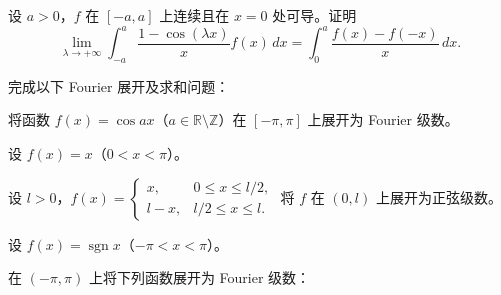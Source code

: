 \noindent\begin{minipage}{\textwidth}
设 $a>0$，$f$ 在 $[-a,a]$ 上连续且在 $x=0$ 处可导。证明\[\lim_{\lambda\to+\infty}\int_{-a}^a\frac{1-\cos(\lambda x)}x f(x)\,dx=\int_0^a\frac{f(x)-f(-x)}x\,dx.\]
\end{minipage}\par\vfill
\newpage
\noindent\begin{minipage}{\textwidth}
完成以下 Fourier 展开及求和问题：
\end{minipage}\par\vfill
\noindent\begin{minipage}{\textwidth}
将函数 $f(x)=\cos ax$（$a\in\mathbb R\setminus\mathbb Z$）在 $[-\pi,\pi]$ 上展开为 Fourier 级数。
\end{minipage}\par\vfill
\noindent\begin{minipage}{\textwidth}
设 $f(x)=x$（$0<x<\pi$）。
\end{minipage}\par\vfill
\newpage
\noindent\begin{minipage}{\textwidth}
设 $l>0$，$\displaystyle f(x)=\begin{cases}x,&0\le x\le l/2,\\l-x,&l/2\le x\le l.\end{cases}$ 将 $f$ 在 $(0,l)$ 上展开为正弦级数。
\end{minipage}\par\vfill
\noindent\begin{minipage}{\textwidth}
设 $f(x)=\operatorname{sgn}x$（$-\pi<x<\pi$）。
\end{minipage}\par\vfill
\noindent\begin{minipage}{\textwidth}
在 $(-\pi,\pi)$ 上将下列函数展开为 Fourier 级数：
\end{minipage}\par\vfill
